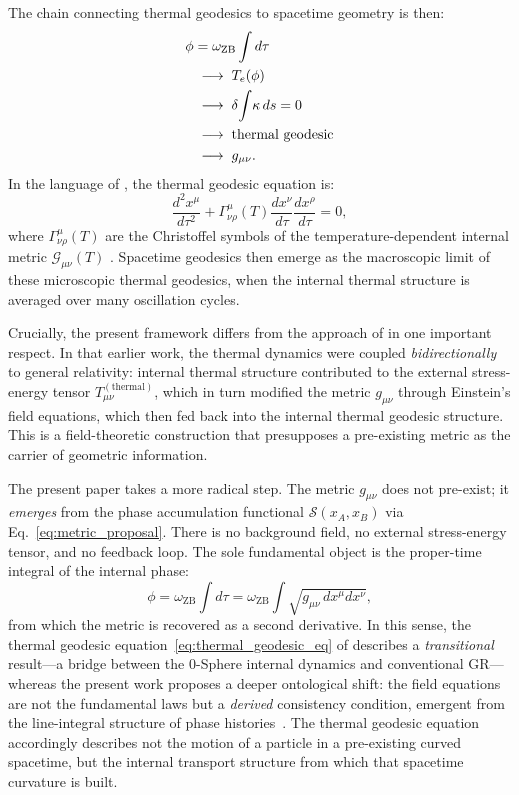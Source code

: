 \documentclass[%
 reprint, amsmath,amssymb, aps, prb, ]{revtex4-2}
\numberwithin{equation}{section}
\newcommand{\omZB}{\omega_{\text{ZB}}}
\begin{document}
The chain connecting thermal geodesics to spacetime geometry is then:
\begin{align}
\phi &= \omZB\int d\tau
\notag\\
&\;\longrightarrow\;
T_e(\phi)
\notag\\
&\;\longrightarrow\;
\delta\!\int\!\kappa\,ds = 0
\notag\\
&\;\longrightarrow\;
\text{thermal geodesic}
\notag\\
&\;\longrightarrow\;
g_{\mu\nu}.
\label{eq:thermal_chain}
\end{align}
In the language of \cite{hanamura24}, the thermal geodesic equation is:
\begin{equation}
\frac{d^2 x^\mu}{d\tau^2} + \Gamma^\mu_{\nu\rho}(T)\frac{dx^\nu}{d\tau}\frac{dx^\rho}{d\tau} = 0,
\label{eq:thermal_geodesic_eq}
\end{equation}
where $\Gamma^\mu_{\nu\rho}(T)$ are the Christoffel symbols of the temperature-dependent internal metric $\mathcal{G}_{\mu\nu}(T)$ \cite{hanamura24}. Spacetime geodesics then emerge as the macroscopic limit of these microscopic thermal geodesics, when the internal thermal structure is averaged over many oscillation cycles.

Crucially, the present framework differs from the approach of \cite{hanamura24} in one important respect. In that earlier work, the thermal dynamics were coupled \emph{bidirectionally} to general relativity: internal thermal structure contributed to the external stress-energy tensor $T_{\mu\nu}^{(\text{thermal})}$, which in turn modified the metric $g_{\mu\nu}$ through Einstein's field equations, which then fed back into the internal thermal geodesic structure. This is a field-theoretic construction that presupposes a pre-existing metric as the carrier of geometric information.

The present paper takes a more radical step. The metric $g_{\mu\nu}$ does not pre-exist; it \emph{emerges} from the phase accumulation functional $\mathcal{S}(x_A, x_B)$ via Eq.~\eqref{eq:metric_proposal}. There is no background field, no external stress-energy tensor, and no feedback loop. The sole fundamental object is the proper-time integral of the internal phase:
\begin{equation}
\phi = \omZB \int d\tau = \omZB \int \sqrt{g_{\mu\nu}\,dx^\mu dx^\nu},
\label{eq:phase_as_history}
\end{equation}
from which the metric is recovered as a second derivative. In this sense, the thermal geodesic equation~\eqref{eq:thermal_geodesic_eq} of \cite{hanamura24} describes a \emph{transitional} result---a bridge between the 0-Sphere internal dynamics and conventional GR---whereas the present work proposes a deeper ontological shift: the field equations are not the fundamental laws but a \emph{derived} consistency condition, emergent from the line-integral structure of phase histories~\cite{hanamura30}. The thermal geodesic equation accordingly describes not the motion of a particle in a pre-existing curved spacetime, but the internal transport structure from which that spacetime curvature is built.
\end{document}
